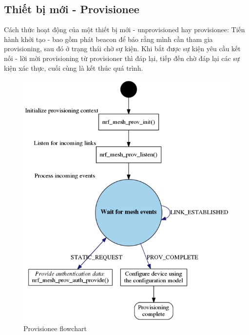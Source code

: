         \subsection{Thiết bị mới - Provisionee}
        Cách thức hoạt động của một thiết bị mới - unprovisioned hay provisionee: Tiến hành khởi tạo - bao gồm phát beacon để báo rằng mình cần tham gia provisioning, sau đó ở trạng thái chờ sự kiện. Khi bắt được sự kiện yêu cầu kết nối - lời mời provisioning từ provisioner thì đáp lại, tiếp đến chờ đáp lại các sự kiện xác thực, cuối cùng là kết thúc quá trình.
        \begin{figure}[h!]
        	\begin{center}
        		\includegraphics[scale=0.6]{images/provisionee_app_flowchart.png}
        		\caption{Provisionee flowchart}
        	\end{center}
        \end{figure}
	\newpage
